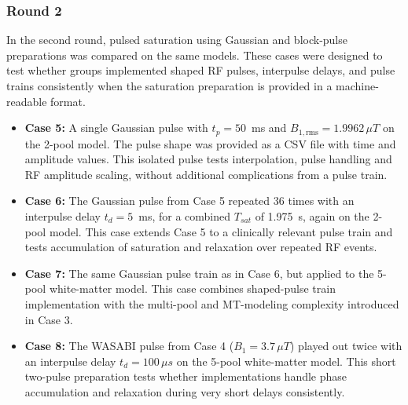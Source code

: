 \documentclass[11pt,a4paper]{article}
\begin{document}
\subsubsection{Round 2}
In the second round, pulsed saturation using Gaussian and block-pulse preparations was compared on the same models. These cases were designed to test whether groups implemented shaped RF pulses, interpulse delays, and pulse trains consistently when the saturation preparation is provided in a machine-readable format.
\begin{itemize}
\item \textbf{Case 5:} A single Gaussian pulse with $t_p=50$~ms and $B_{1,\mathrm{rms}}=1.9962\,\mu T$ on the 2-pool model. The pulse shape was provided as a CSV file with time and amplitude values. This isolated pulse tests interpolation, pulse handling and RF amplitude scaling, without additional complications from a pulse train.
\item \textbf{Case 6:} The Gaussian pulse from Case 5 repeated 36 times with an interpulse delay $t_d=5$~ms, for a combined $T_{sat}$ of 1.975~s, again on the 2-pool model. This case extends Case 5 to a clinically relevant pulse train and tests accumulation of saturation and relaxation over repeated RF events.
\item  \textbf{Case 7:} The same Gaussian pulse train as in Case 6, but applied to the 5-pool white-matter model. This case combines shaped-pulse train implementation with the multi-pool and MT-modeling complexity introduced in Case 3.
\item  \textbf{Case 8:} The WASABI pulse from Case 4 ($B_{1}=3.7\,\mu T$) played out twice with an interpulse delay $t_d=100\,\mu s$ on the 5-pool white-matter model. This short two-pulse preparation tests whether implementations handle phase accumulation and relaxation during very short delays consistently.
\end{itemize}
\end{document}
